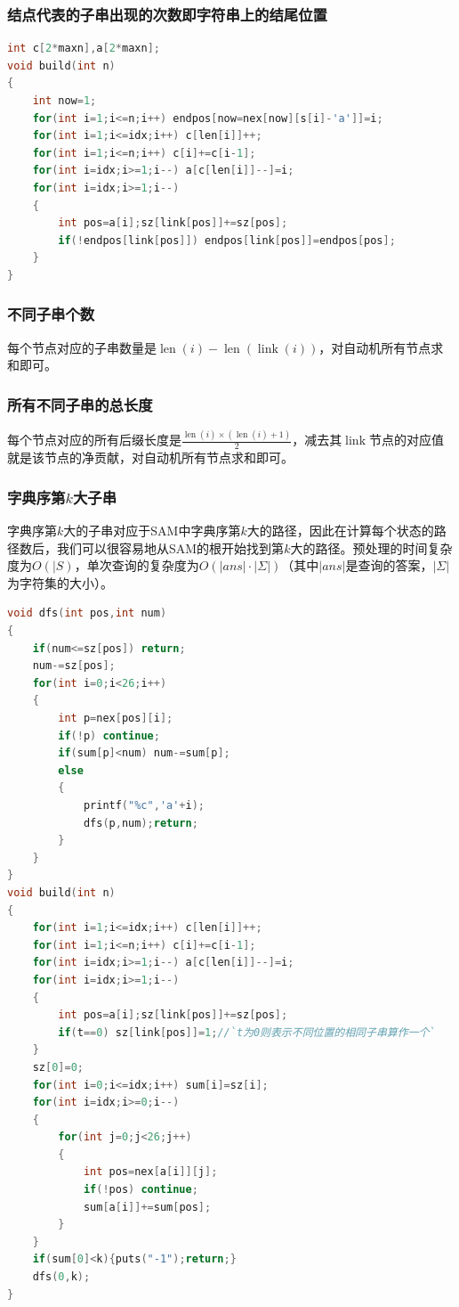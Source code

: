 \documentclass[a4paper]{book}
\begin{document}
\subsubsection{结点代表的子串出现的次数即字符串上的结尾位置}
\begin{lstlisting}[language=c++]
int c[2*maxn],a[2*maxn];
void build(int n)
{
    int now=1;
    for(int i=1;i<=n;i++) endpos[now=nex[now][s[i]-'a']]=i;
    for(int i=1;i<=idx;i++) c[len[i]]++;
    for(int i=1;i<=n;i++) c[i]+=c[i-1];
    for(int i=idx;i>=1;i--) a[c[len[i]]--]=i;
    for(int i=idx;i>=1;i--) 
    {
        int pos=a[i];sz[link[pos]]+=sz[pos];
        if(!endpos[link[pos]]) endpos[link[pos]]=endpos[pos];
    }
}
\end{lstlisting}
\subsubsection{不同子串个数}
每个节点对应的子串数量是$\operatorname{len}(i)-\operatorname{len}(\operatorname{link}(i))$，对自动机所有节点求和即可。
\subsubsection{所有不同子串的总长度}
每个节点对应的所有后缀长度是$\frac{\operatorname{len}(i)\times(\operatorname{len}(i)+1)}{2}$，减去其$\operatorname{link}$节点的对应值就是该节点的净贡献，对自动机所有节点求和即可。
\subsubsection{字典序第$k$大子串}
字典序第$k$大的子串对应于SAM中字典序第$k$大的路径，因此在计算每个状态的路径数后，我们可以很容易地从SAM的根开始找到第$k$大的路径。预处理的时间复杂度为$O(|S)$，单次查询的复杂度为$O(|ans|\cdot|\Sigma|)$（其中$|ans|$是查询的答案，$|\Sigma|$为字符集的大小）。
\begin{lstlisting}[language=c++,escapeinside=``]
void dfs(int pos,int num)
{
    if(num<=sz[pos]) return;
    num-=sz[pos];
    for(int i=0;i<26;i++)
    {
        int p=nex[pos][i];
        if(!p) continue;
        if(sum[p]<num) num-=sum[p];
        else 
        {
            printf("%c",'a'+i);
            dfs(p,num);return;
        }
    }
}
void build(int n)
{
    for(int i=1;i<=idx;i++) c[len[i]]++;
    for(int i=1;i<=n;i++) c[i]+=c[i-1];
    for(int i=idx;i>=1;i--) a[c[len[i]]--]=i;
    for(int i=idx;i>=1;i--) 
    {
        int pos=a[i];sz[link[pos]]+=sz[pos];
        if(t==0) sz[link[pos]]=1;//`t为0则表示不同位置的相同子串算作一个`
    }
    sz[0]=0;
    for(int i=0;i<=idx;i++) sum[i]=sz[i];
    for(int i=idx;i>=0;i--)
    {
        for(int j=0;j<26;j++)
        {
            int pos=nex[a[i]][j];
            if(!pos) continue;
            sum[a[i]]+=sum[pos];
        }
    }
    if(sum[0]<k){puts("-1");return;}
    dfs(0,k);
}
\end{lstlisting}
\end{document}
